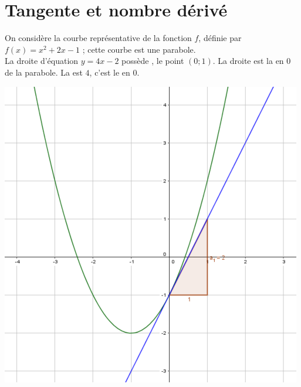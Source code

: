 \documentclass[12pt,a4paper]{article}
\date{}
\title{}
\begin{document}
	
	\section{Tangente et nombre dérivé}
	
	
	\begin{myprops}
	\begin{multicols}{2}
		

	
	
	
	On considère la courbe représentative de la fonction $f$, définie par $f(x) = x^2 + 2x - 1$ ; cette courbe est une parabole.\\
	
	
	La droite d'équation $y = 4x - 2$ possède , le point $(0 ; 1)$. La droite est la  en 0 de la parabole.
	La  est $4$, c'est le  en 0. 
	
	\includegraphics[scale=0.5]{./img/ex}
	\end{multicols}
	\end{myprops}
	
\end{document}
